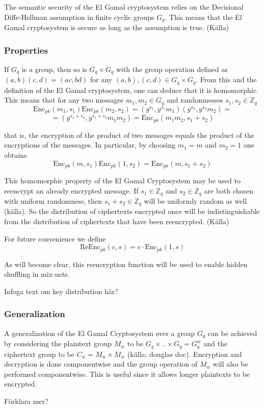 The semantic security of the El Gamal cryptosystem relies on the
Decisional Diffe-Hellman assumption in finite cyclic groups
$G_q$. This means that the El Gamal cryptosystem is secure as long as
the assumption is true. (Källa)

\subsubsection{Properties}
If $G_q$ is a group, then so is $G_q \times G_q$ with the group
operation defined as $(a,b)(c,d) = (a c, b d)$ for any $(a,b),(c,d)
\in G_q \times G_q$. From this and the definition of the El Gamal
cryptosystem, one can deduce that it is homomorphic. This means that
for any two messages $m_1, m_2 \in G_q$ and randomnesses $s_1, s_2 \in
\mathbb{Z}_q$
$$
 \mathrm{Enc}_{pk}(m_1, s_1)\mathrm{Enc}_{pk}(m_2, s_2) =
(g^{s_1}, y^{s_1}m_1)(g^{s_2},y^{s_2}m_2) =
$$
$$
= (g^{s_1 + s_2}, y^{s_1 + s_2}m_1m_2) = \mathrm{Enc}_{pk}(m_1m_2, s_1 + s_2)
$$

that is, the encryption of the product of two messages equals the
product of the encryptions of the messages. In particular, by choosing
$m_1 = m$ and $m_2 = 1$ one obtains
$$
\mathrm{Enc}_{pk}(m, s_1) \mathrm{Enc}_{pk}(1, s_2) = \mathrm{Enc}_{pk}(m, s_1 + s_2)
$$

This homomorphic property of the El Gamal Cryptosystem may be used to
reencrypt an already encrypted message. If $s_1 \in \mathbb{Z}_q$ and
$s_2 \in \mathbb{Z}_q$ are both chosen with uniform randomness, then
$s_1 + s_2 \in \mathbb{Z}_q$ will be uniformly random as well
(källa). So the distribution of ciphertexts encrypted once
will be indistinguishable from the distribution of ciphertexts that
have been reencrypted. (Källa)

For future convenience we define
$$
\mathrm{ReEnc}_{pk}(c,s) = c \cdot \mathrm{Enc}_{pk}(1,s) 
$$

As will become clear, this reencryption function will be used to
enable hidden shuffling in mix-nets.

Infoga text om key distribution här?


\subsubsection{Generalization}
A generalization of the El Gamal Cryptosystem over a group $G_q$ can
be achieved by considering the plaintext group $M_w$ to be $G_q \times
.. \times G_q = G_q^w$ and the ciphertext group to be $C_w = M_w
\times M_w$ (källa: douglas doc). Encryption and decryption is done
componentwise and the group operation of $M_w$ will also be performed
componentwise. This is useful since it allows longer plaintexts to be
encrypted.
 
Förklara mer?

